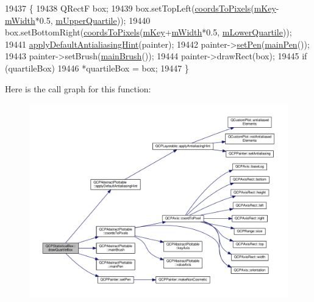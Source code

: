 \begin{DoxyCode}
19437 \{
19438   QRectF box;
19439   box.setTopLeft(\hyperlink{class_q_c_p_abstract_plottable_ade710a776104b14c1c835168ce1bfc5c}{coordsToPixels}(\hyperlink{class_q_c_p_statistical_box_a86fd1d3be5c5bc11d11eda7517069af4}{mKey}-\hyperlink{class_q_c_p_statistical_box_af365e40b0f706c3d76f857c7957f629d}{mWidth}*0.5, 
      \hyperlink{class_q_c_p_statistical_box_a865afbcca332ee851aa45807381bc80e}{mUpperQuartile}));
19440   box.setBottomRight(\hyperlink{class_q_c_p_abstract_plottable_ade710a776104b14c1c835168ce1bfc5c}{coordsToPixels}(\hyperlink{class_q_c_p_statistical_box_a86fd1d3be5c5bc11d11eda7517069af4}{mKey}+\hyperlink{class_q_c_p_statistical_box_af365e40b0f706c3d76f857c7957f629d}{mWidth}*0.5, 
      \hyperlink{class_q_c_p_statistical_box_acac86cac93d9fa3d820b5aaa04ed96f6}{mLowerQuartile}));
19441   \hyperlink{class_q_c_p_abstract_plottable_a76e9d6cc7972dc1528f526d163766aca}{applyDefaultAntialiasingHint}(painter);
19442   painter->\hyperlink{class_q_c_p_painter_af9c7a4cd1791403901f8c5b82a150195}{setPen}(\hyperlink{class_q_c_p_abstract_plottable_a19276ed2382a3a06464417b8788b1451}{mainPen}());
19443   painter->setBrush(\hyperlink{class_q_c_p_abstract_plottable_ae74c123832da180c17e22203e748d9b7}{mainBrush}());
19444   painter->drawRect(box);
19445   \textcolor{keywordflow}{if} (quartileBox)
19446     *quartileBox = box;
19447 \}
\end{DoxyCode}


Here is the call graph for this function\+:\nopagebreak
\begin{figure}[H]
\begin{center}
\leavevmode
\includegraphics[width=350pt]{class_q_c_p_statistical_box_a9ad0abdb154fefb04e9872f0db8e2ec7_cgraph}
\end{center}
\end{figure}




